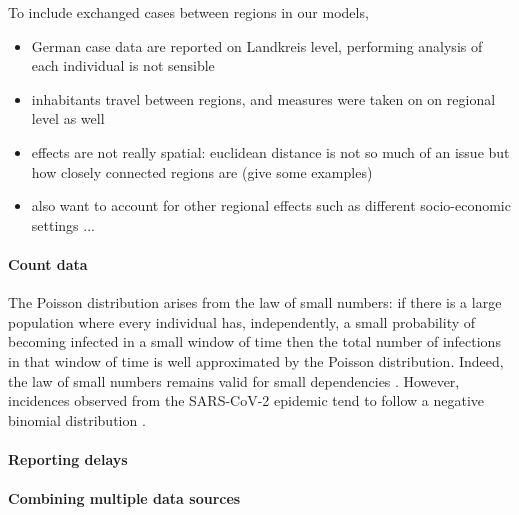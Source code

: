 To include exchanged cases between regions in our models, 


\begin{itemize}
    \item German case data are reported on Landkreis level, performing analysis of each individual is not sensible 
    \item inhabitants travel between regions, and measures were taken on on regional level as well
    \item effects are not really spatial: euclidean distance is not so much of an issue but how closely connected regions are (give some examples)
    \item also want to account for other regional effects such as different socio-economic settings ... 
\end{itemize}

\paragraph{Count data}

The Poisson distribution arises from the law of small numbers: if there is a large population where every individual has, independently, a small probability of becoming infected in a small window of time then the total number of infections in that window of time is well approximated by the Poisson distribution.
Indeed, the law of small numbers remains valid for small dependencies \citep{Ross2011Fundamentalsa,Arratia1990Poisson}.
However, incidences observed from the SARS-CoV-2 epidemic tend to follow a negative binomial distribution \citep{Chan2021Count}. 

\paragraph{Reporting delays}

\paragraph{Combining multiple data sources}



